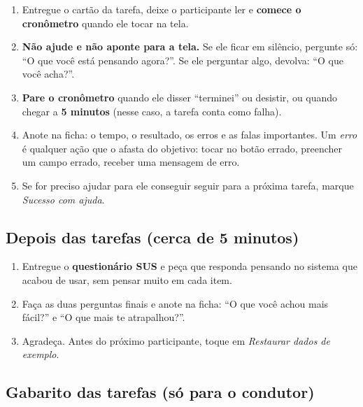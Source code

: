 \documentclass[a4paper,12pt]{article}
\begin{document}
\begin{enumerate}[leftmargin=1cm]
  \item Entregue o cartão da tarefa, deixe o participante ler e \textbf{comece
    o cronômetro} quando ele tocar na tela.
  \item \textbf{Não ajude e não aponte para a tela.} Se ele ficar em silêncio,
    pergunte só: ``O que você está pensando agora?''. Se ele perguntar algo,
    devolva: ``O que você acha?''.
  \item \textbf{Pare o cronômetro} quando ele disser ``terminei'' ou desistir,
    ou quando chegar a \textbf{5 minutos} (nesse caso, a tarefa conta como falha).
  \item Anote na ficha: o tempo, o resultado, os erros e as falas importantes.
    Um \emph{erro} é qualquer ação que o afasta do objetivo: tocar no botão
    errado, preencher um campo errado, receber uma mensagem de erro.
  \item Se for preciso ajudar para ele conseguir seguir para a próxima tarefa,
    marque \emph{Sucesso com ajuda}.
\end{enumerate}

\subsection*{Depois das tarefas (cerca de 5 minutos)}

\begin{enumerate}[leftmargin=1cm]
  \item Entregue o \textbf{questionário SUS} e peça que responda pensando no
    sistema que acabou de usar, sem pensar muito em cada item.
  \item Faça as duas perguntas finais e anote na ficha:
    ``O que você achou mais fácil?'' e ``O que mais te atrapalhou?''.
  \item Agradeça. Antes do próximo participante, toque em
    \emph{Restaurar dados de exemplo}.
\end{enumerate}

\subsection*{Gabarito das tarefas (só para o condutor)}
\end{document}
